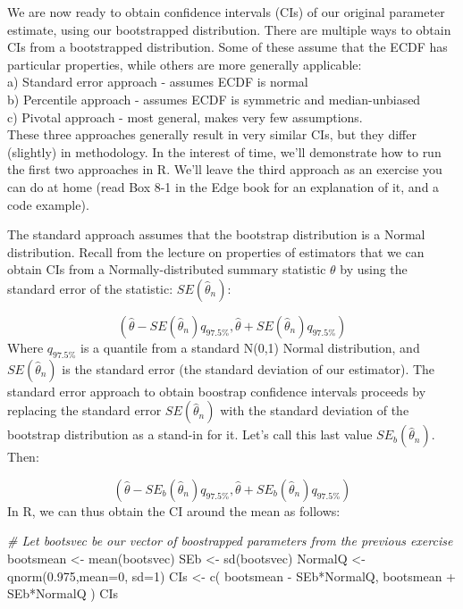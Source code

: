\documentclass[
]{book}
\newenvironment{Shaded}{\begin{snugshade}}{\end{snugshade}}
\newcommand{\AttributeTok}[1]{\textcolor[rgb]{0.77,0.63,0.00}{#1}}
\newcommand{\CommentTok}[1]{\textcolor[rgb]{0.56,0.35,0.01}{\textit{#1}}}
\newcommand{\DecValTok}[1]{\textcolor[rgb]{0.00,0.00,0.81}{#1}}
\newcommand{\FloatTok}[1]{\textcolor[rgb]{0.00,0.00,0.81}{#1}}
\newcommand{\FunctionTok}[1]{\textcolor[rgb]{0.00,0.00,0.00}{#1}}
\newcommand{\NormalTok}[1]{#1}
\newcommand{\OtherTok}[1]{\textcolor[rgb]{0.56,0.35,0.01}{#1}}
\newcommand{\SpecialCharTok}[1]{\textcolor[rgb]{0.00,0.00,0.00}{#1}}
\begin{document}
We are now ready to obtain confidence intervals (CIs) of our original parameter estimate, using our bootstrapped distribution. There are multiple ways to obtain CIs from a bootstrapped distribution. Some of these assume that the ECDF has particular properties, while others are more generally applicable:\\
a) Standard error approach - assumes ECDF is normal\\
b) Percentile approach - assumes ECDF is symmetric and median-unbiased\\
c) Pivotal approach - most general, makes very few assumptions.\\
These three approaches generally result in very similar CIs, but they differ (slightly) in methodology. In the interest of time, we'll demonstrate how to run the first two approaches in R. We'll leave the third approach as an exercise you can do at home (read Box 8-1 in the Edge book for an explanation of it, and a code example).

The standard approach assumes that the bootstrap distribution is a Normal distribution. Recall from the lecture on properties of estimators that we can obtain CIs from a Normally-distributed summary statistic \(\theta\) by using the standard error of the statistic: \(SE(\hat{\theta}_n)\):

\[(\hat{\theta} - SE(\hat{\theta}_n)q_{97.5\%}, \hat{\theta} + SE(\hat{\theta}_n)q_{97.5\%})\]
Where \(q_{97.5\%}\) is a quantile from a standard N(0,1) Normal distribution, and \(SE(\hat{\theta}_n)\) is the standard error (the standard deviation of our estimator). The standard error approach to obtain boostrap confidence intervals proceeds by replacing the standard error \(SE(\hat{\theta}_n)\) with the standard deviation of the bootstrap distribution as a stand-in for it. Let's call this last value \(SE_b(\hat{\theta}_n)\). Then:

\[(\hat{\theta} - SE_b(\hat{\theta}_n)q_{97.5\%}, \hat{\theta} + SE_b(\hat{\theta}_n)q_{97.5\%})\]
In R, we can thus obtain the CI around the mean as follows:

\begin{Shaded}
\begin{Highlighting}[]
\CommentTok{\# Let bootsvec be our vector of boostrapped parameters from the previous exercise}
\NormalTok{bootsmean }\OtherTok{\textless{}{-}} \FunctionTok{mean}\NormalTok{(bootsvec)}
\NormalTok{SEb }\OtherTok{\textless{}{-}} \FunctionTok{sd}\NormalTok{(bootsvec)}
\NormalTok{NormalQ }\OtherTok{\textless{}{-}} \FunctionTok{qnorm}\NormalTok{(}\FloatTok{0.975}\NormalTok{,}\AttributeTok{mean=}\DecValTok{0}\NormalTok{, }\AttributeTok{sd=}\DecValTok{1}\NormalTok{)}
\NormalTok{CIs }\OtherTok{\textless{}{-}} \FunctionTok{c}\NormalTok{( bootsmean }\SpecialCharTok{{-}}\NormalTok{ SEb}\SpecialCharTok{*}\NormalTok{NormalQ, bootsmean }\SpecialCharTok{+}\NormalTok{ SEb}\SpecialCharTok{*}\NormalTok{NormalQ )}
\NormalTok{CIs}
\end{Highlighting}
\end{Shaded}
\end{document}
